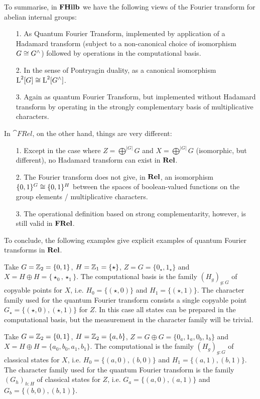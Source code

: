 To summarise, in $\mathbf{FHilb}$ we have the following views of the Fourier transform for abelian internal groups:
\begin{enumerate}
\item[1.] As Quantum Fourier Transform, implemented by application of a Hadamard transform (subject to a non-canonical choice of isomorphism $G \cong G^\wedge$) followed by operations in the computational basis.
\item[2.] In the sense of Pontryagin duality, as a canonical isomorphism $\operatorname{L}^2[G] \cong \operatorname{L}^2[G^\wedge]$.
\item[3.] Again as quantum Fourier Transform, but implemented without Hadamard transform by operating in the strongly complementary basis of multiplicative characters.
\end{enumerate}

In $\cat{FRel}$, on the other hand, things are very different:
\begin{enumerate}
\item[1.] Except in the case where $Z = \bigoplus^{|G|}G$ and $X = \bigoplus^{|G|}G$ (isomorphic, but different), no Hadamard transform can exist in $\mathbf{Rel}$.
\item[2.] The Fourier transform does not give, in $\mathbf{Rel}$, an isomorphism $\{0,1\}^G \cong \{0,1\}^H$ between the spaces of boolean-valued functions on the group elements / multiplicative characters.
\item[3.] The operational definition based on strong complementarity, however, is still valid in $\mathbf{FRel}$. 
\end{enumerate}

To conclude, the following examples give explicit examples of quantum Fourier transforms in $\mathbf{Rel}$.

\begin{example}
Take $G=\mathbb{Z}_{2}=\{0,1\}$, $H=\mathbb{Z}_{1}=\{\star\}$, $Z = G = \{ 0_\star,1_\star \}$ and $X=H\oplus H = \{ \star_0,\star_1 \}$. The computational basis is the family $(H_g)_{g:G}$ of copyable points for $X$, i.e. $H_0 = \{(\star,0)\}$ and $H_1 = \{(\star,1)\}$. The character family used for the quantum Fourier transform consists a single copyable point $G_\star = \{(\star,0), (\star,1)\}$ for $Z$. In this case all states can be prepared in the computational basis, but the measurement in the character family will be trivial.
\end{example}

\begin{example}
Take $G=\mathbb{Z}_{2}=\{0,1\}$, $H=\mathbb{Z}_{2}=\{a,b\}$, $Z = G \oplus G = \{ 0_a,1_a,0_b,1_b\}$ and $X= H \oplus H = \{ a_0, b_0, a_1, b_1 \}$. The computational  is the family $(H_g)_{g:G}$ of classical states for $X$, i.e. $H_0 = \{(a,0),(b,0)\}$ and $H_1 = \{(a,1),(b,1)\}$. The character family used for the quantum Fourier transform is the family $(G_h)_{h:H}$ of classical states for $Z$, i.e. $G_a = \{(a,0),(a,1)\}$ and $G_b = \{(b,0),(b,1)\}$.
\end{example}

